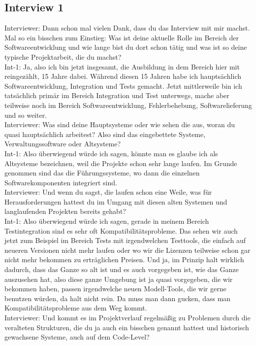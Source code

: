 \subsection*{Interview 1}

Interviewer: Dann schon mal vielen Dank, dass du das Interview mit mir machst. Mal so ein bisschen zum Einstieg: Was ist deine aktuelle Rolle im Bereich der Softwareentwicklung und wie lange bist du dort schon tätig und was ist so deine typische Projektarbeit, die du machst?\\
Int-1: Ja, also ich bin jetzt insgesamt, die Ausbildung in dem Bereich hier mit reingezählt, 15 Jahre dabei. Während diesen 15 Jahren habe ich hauptsächlich Softwareentwicklung, Integration und Tests gemacht. Jetzt mittlerweile bin ich tatsächlich primär im Bereich Integration und Test unterwegs, mache aber teilweise noch im Bereich Softwareentwicklung, Fehlerbehebung, Softwarelieferung und so weiter.\\ 
Interviewer: Was sind deine Hauptsysteme oder wie sehen die aus, woran du quasi hauptsächlich arbeitest? Also sind das eingebettete Systeme, Verwaltungssoftware oder Altsysteme?\\ 
Int-1: Also überwiegend würde ich sagen, könnte man es glaube ich als Altsysteme bezeichnen, weil die Projekte schon sehr lange laufen. Im Grunde genommen sind das die Führungssysteme, wo dann die einzelnen Softwarekomponenten integriert sind.\\ 
Interviewer: Und wenn du sagst, die laufen schon eine Weile, was für Herausforderungen hattest du im Umgang mit diesen alten Systemen und langlaufenden Projekten bereits gehabt?\\
Int-1: Also überwiegend würde ich sagen, gerade in meinem Bereich Testintegration sind es sehr oft Kompatibilitätsprobleme. Das sehen wir auch jetzt zum Beispiel im Bereich Tests mit irgendwelchen Testtools, die einfach auf neueren Versionen nicht mehr laufen oder wo wir die Lizenzen teilweise schon gar nicht mehr bekommen zu erträglichen Preisen. Und ja, im Prinzip halt wirklich dadurch, dass das Ganze so alt ist und es auch vorgegeben ist, wie das Ganze auszusehen hat, also diese ganze Umgebung ist ja quasi vorgegeben, die wir bekommen haben, passen irgendwelche neuen Modell-Tools, die wir gerne benutzen würden, da halt nicht rein. Da muss man dann gucken, dass man Kompatibilitätsprobleme aus dem Weg kommt.\\ 
Interviewer: Und kommt es im Projektverlauf regelmäßig zu Problemen durch die veralteten Strukturen, die du ja auch ein bisschen genannt hattest und historisch gewachsene Systeme, auch auf dem Code-Level?\\
